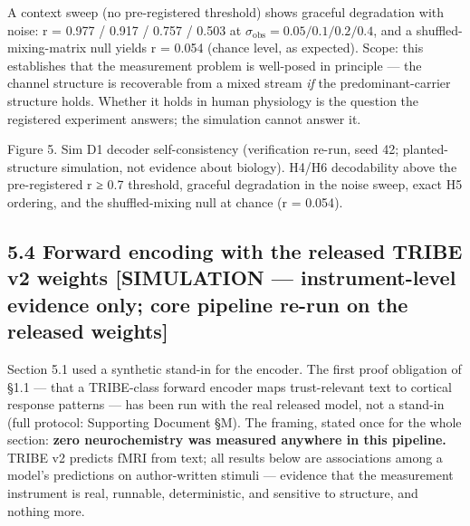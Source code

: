 \documentclass[
]{article}
\begin{document}
A context sweep (no pre-registered threshold) shows graceful degradation
with noise: r = 0.977 / 0.917 / 0.757 / 0.503 at
\(\sigma_{\mathrm{obs}} = 0.05 / 0.1 / 0.2 / 0.4\), and a
shuffled-mixing-matrix null yields r = 0.054 (chance level, as
expected). Scope: this establishes that the measurement problem is
well-posed in principle --- the channel structure is recoverable from a
mixed stream \emph{if} the predominant-carrier structure holds. Whether
it holds in human physiology is the question the registered experiment
answers; the simulation cannot answer it.

Figure 5. Sim D1 decoder self-consistency (verification re-run, seed 42;
planted-structure simulation, not evidence about biology). H4/H6
decodability above the pre-registered {r ≥ 0.7} threshold, graceful
degradation in the noise sweep, exact H5 ordering, and the
shuffled-mixing null at chance ({r = 0.054}).

\subsection{5.4 Forward encoding with the released TRIBE v2 weights
{[}SIMULATION --- instrument-level evidence only; core pipeline re-run
on the released
weights{]}}\label{forward-encoding-with-the-released-tribe-v2-weights-simulation-instrument-level-evidence-only-core-pipeline-re-run-on-the-released-weights}

Section 5.1 used a synthetic stand-in for the encoder. The first proof
obligation of §1.1 --- that a TRIBE-class forward encoder maps
trust-relevant text to cortical response patterns --- has been run with
the real released model, not a stand-in (full protocol: Supporting
Document §M). The framing, stated once for the whole section:
\textbf{zero neurochemistry was measured anywhere in this pipeline.}
TRIBE v2 predicts fMRI from text; all results below are associations
among a model's predictions on author-written stimuli --- evidence that
the measurement instrument is real, runnable, deterministic, and
sensitive to structure, and nothing more.
\end{document}
